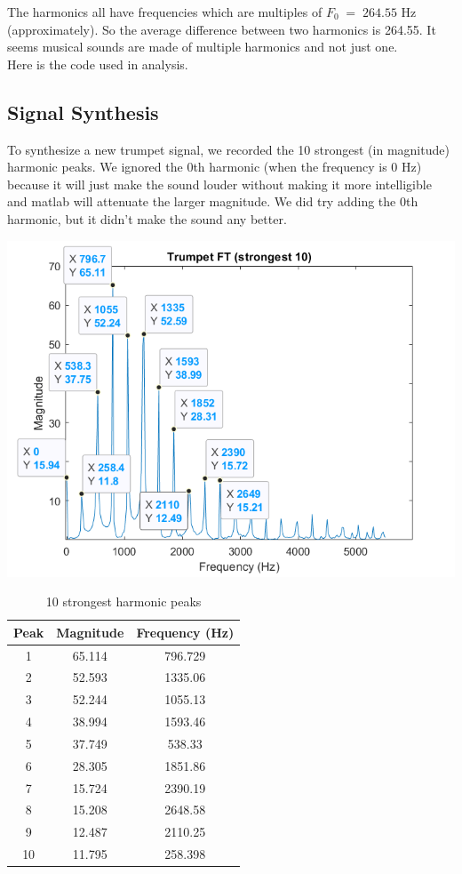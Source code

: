 \documentclass[11pt]{article}
\begin{document}
The harmonics all have frequencies which are multiples of $F_0 \; = \; 264.55$ Hz (approximately).
So the average difference between two harmonics is 264.55. It seems musical sounds are
made of multiple harmonics and not just one.\\

Here is the code used in analysis.

\begin{framed}
	
\end{framed}

\subsection{Signal Synthesis}

To synthesize a new trumpet signal, we recorded the 10 strongest (in magnitude) harmonic peaks.
We ignored the 0th harmonic (when the frequency is 0 Hz) because it will just make the sound louder 
without making it more intelligible and matlab will attenuate the larger magnitude.
We did try adding the 0th harmonic, but it didn't make the sound any better.

\includegraphics[width=\textwidth]{trumpet_ft_strongest10.png}

\begin{table}[H]
	\centering
	\begin{tabular}{c c c}\toprule
		Peak & Magnitude & Frequency (Hz) \\\midrule
		 1 & 65.114 & 796.729 \\
		 2 & 52.593 & 1335.06 \\
		 3 & 52.244 & 1055.13 \\
		 4 & 38.994 & 1593.46 \\
		 5 & 37.749 & 538.33  \\
		 6 & 28.305 & 1851.86 \\
		 7 & 15.724 & 2390.19 \\
		 8 & 15.208 & 2648.58 \\
		 9 & 12.487 & 2110.25 \\
		10 & 11.795 & 258.398 \\\bottomrule
	\end{tabular}
	\caption{\label{tab:strongest-harmonics}10 strongest harmonic peaks}
\end{table}
\end{document}
